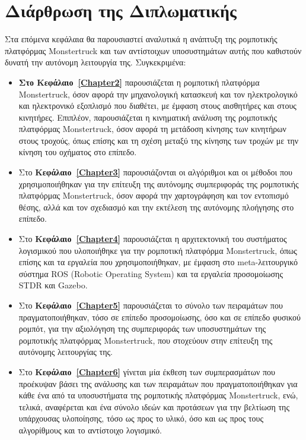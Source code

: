 
\section{Διάρθρωση της Διπλωματικής}
Στα επόμενα κεφάλαια θα παρουσιαστεί αναλυτικά η ανάπτυξη της ρομποτικής πλατφόρμας Monstertruck και των αντίστοιχων υποσυστημάτων αυτής που καθιστούν δυνατή την αυτόνομη λειτουργία της. Συγκεκριμένα:

\begin{itemize}
	\item \textbf{Στο Κεφάλαιο~\ref{Chapter2}} παρουσιάζεται η ρομποτική πλατφόρμα Monstertruck, όσον αφορά την μηχανολογική κατασκευή και τον ηλεκτρολογικό και ηλεκτρονικό εξοπλισμό που διαθέτει, με έμφαση στους αισθητήρες και στους κινητήρες. Επιπλέον, παρουσιάζεται η κινηματική ανάλυση της ρομποτικής πλατφόρμας Monstertruck, όσον αφορά τη μετάδοση κίνησης των κινητήρων στους τροχούς, όπως επίσης και τη σχέση μεταξύ της κίνησης των τροχών με την κίνηση του οχήματος στο επίπεδο.
	\item Στο \textbf{Κεφάλαιο~\ref{Chapter3}} παρουσιάζονται οι αλγόριθμοι και οι μέθοδοι που χρησιμοποιήθηκαν για την επίτευξη της αυτόνομης συμπεριφοράς της ρομποτικής πλατφόρμας Monstertruck, όσον αφορά την χαρτογράφηση και τον εντοπισμό θέσης, αλλά και τον σχεδιασμό και την εκτέλεση της αυτόνομης πλοήγησης στο επίπεδο.
	\item Στο \textbf{Κεφάλαιο~\ref{Chapter4}} παρουσιάζεται η αρχιτεκτονική του συστήματος λογισμικού που υλοποιήθηκε για την ρομποτική πλατφόρμα Monstertruck, όπως επίσης και τα εργαλεία που χρησιμοποιήθηκαν, με έμφαση στο meta-λειτουργικό σύστημα ROS (Robotic Operating System) και τα εργαλεία προσομοίωσης STDR και Gazebo.
	\item Στο \textbf{Κεφάλαιο~\ref{Chapter5}} παρουσιάζεται το σύνολο των πειραμάτων που πραγματοποιήθηκαν, τόσο σε επίπεδο προσομοίωσης, όσο και σε επίπεδο φυσικού ρομπότ, για την αξιολόγηση της συμπεριφοράς των υποσυστημάτων της ρομποτικής πλατφόρμας Monstertruck, που στοχεύουν στην επίτευξη της αυτόνομης λειτουργίας της.
	\item Στο \textbf{Κεφάλαιο~\ref{Chapter6}} γίνεται μία έκθεση των συμπερασμάτων που προέκυψαν βάσει της ανάλυσης και των πειραμάτων που πραγματοποιήθηκαν για κάθε ένα από τα υποσυστήματα της ρομποτικής πλατφόρμας Monstertruck, ενώ, τελικά, αναφέρεται και ένα σύνολο ιδεών και προτάσεων για την βελτίωση της υπάρχουσας υλοποίησης, τόσο ως προς το υλικό, όσο και ως προς τους αλγορίθμους και το αντίστοιχο λογισμικό.
\end{itemize}
